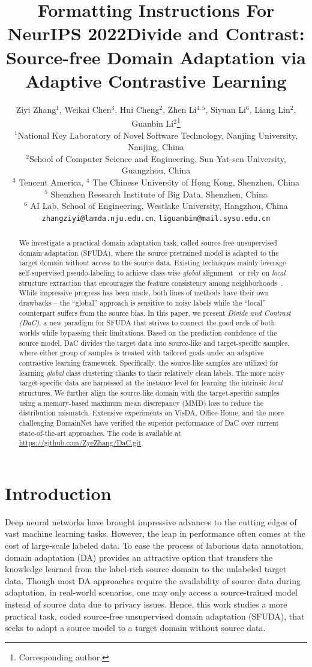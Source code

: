 \documentclass{article}
\title{Formatting Instructions For NeurIPS 2022}
\title{Divide and Contrast: Source-free Domain Adaptation via Adaptive Contrastive Learning}
\author{Ziyi Zhang$^{1}$, Weikai Chen$^{3}$, Hui Cheng$^{2}$, Zhen Li$^{4,5}$, Siyuan Li$^{6}$, Liang Lin$^{2}$, Guanbin Li$^{2}$\thanks{Corresponding author.} \\
$^1$National Key Laboratory of Novel Software Technology, Nanjing University, Nanjing, China\\
$^2$School of Computer Science and Engineering, Sun Yat-sen University, Guangzhou, China\\
$^3$ Tencent America,
$^4$ The Chinese University of Hong Kong, Shenzhen, China\\
$^5$ Shenzhen Research Institute of Big Data, Shenzhen, China\\
$^6$  AI Lab, School of Engineering, Westlake University, Hangzhou, China
{\tt\footnotesize zhangziyi@lamda.nju.edu.cn}, {\tt\small liguanbin@mail.sysu.edu.cn}
}
\newcommand{\modelName}{DaC}
\newcommand{\methodName}{Divide and Contrast}
\begin{document}
\maketitle


\begin{abstract}
We investigate a practical domain adaptation task, called source-free unsupervised domain adaptation (SFUDA), where the source pretrained model is adapted to the target domain without access to the source data. Existing  techniques mainly leverage self-supervised pseudo-labeling to achieve class-wise \textit{global} alignment~\cite{shot} or rely on \textit{local} structure extraction that encourages the feature consistency among neighborhoods~\cite{nrc_nips_2021}.
While impressive progress has been made, both lines of methods have their own drawbacks -- the ``global'' approach is sensitive to noisy labels while the ``local'' counterpart suffers from the source bias.
In this paper, we present \textit{\methodName{} (\modelName{})}, a new paradigm for SFUDA that strives to connect the good ends of both worlds while bypassing their limitations. 
Based on the prediction confidence of the source model, \modelName{} {divides} the target data into source-like and target-specific samples, where either group of samples is treated with tailored goals under an adaptive {contrastive} learning framework. 
Specifically, the source-like samples are utilized for learning \textit{global} class clustering thanks to their relatively clean labels.
The more noisy target-specific data are harnessed at the instance level for learning the intrinsic \textit{local} structures.
We further align the source-like domain with the target-specific samples using a memory-based maximum mean discrepancy (MMD) loss to reduce the distribution mismatch.
Extensive experiments on VisDA, Office-Home, and the more challenging DomainNet have verified the superior performance of \modelName{} over current state-of-the-art approaches. The code is available at \url{https://github.com/ZyeZhang/DaC.git}.
\end{abstract}

\section{Introduction}
Deep neural networks have brought impressive advances to the cutting edges of vast machine learning tasks. 
However, the leap in performance often comes at the cost of large-scale labeled data.
To ease the process of laborious data annotation, domain adaptation (DA) provides an attractive option that transfers the knowledge learned from the label-rich source domain to the unlabeled target data.
Though most DA approaches require the availability of source data during adaptation, in real-world scenarios, one may only access a source-trained model instead of source data due to privacy issues.
Hence, this work studies a more practical task, coded source-free unsupervised domain adaptation (SFUDA), that seeks to adapt a source model to a target domain without source data.
\end{document}
